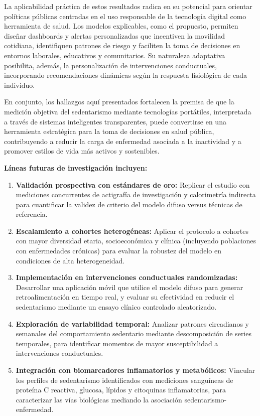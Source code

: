 La aplicabilidad práctica de estos resultados radica en su potencial para orientar políticas públicas centradas en el uso responsable de la tecnología digital como herramienta de salud. Los modelos explicables, como el propuesto, permiten diseñar dashboards y alertas personalizadas que incentiven la movilidad cotidiana, identifiquen patrones de riesgo y faciliten la toma de decisiones en entornos laborales, educativos y comunitarios. Su naturaleza adaptativa posibilita, además, la personalización de intervenciones conductuales, incorporando recomendaciones dinámicas según la respuesta fisiológica de cada individuo.

En conjunto, los hallazgos aquí presentados fortalecen la premisa de que la medición objetiva del sedentarismo mediante tecnologías portátiles, interpretada a través de sistemas inteligentes transparentes, puede convertirse en una herramienta estratégica para la toma de decisiones en salud pública, contribuyendo a reducir la carga de enfermedad asociada a la inactividad y a promover estilos de vida más activos y sostenibles.

\textbf{Líneas futuras de investigación incluyen:}

\begin{enumerate}
    \item \textbf{Validación prospectiva con estándares de oro:} Replicar el estudio con mediciones concurrentes de actigrafía de investigación y calorimetría indirecta para cuantificar la validez de criterio del modelo difuso versus técnicas de referencia.
    
    \item \textbf{Escalamiento a cohortes heterogéneas:} Aplicar el protocolo a cohortes con mayor diversidad etaria, socioeconómica y clínica (incluyendo poblaciones con enfermedades crónicas) para evaluar la robustez del modelo en condiciones de alta heterogeneidad.
    
    \item \textbf{Implementación en intervenciones conductuales randomizadas:} Desarrollar una aplicación móvil que utilice el modelo difuso para generar retroalimentación en tiempo real, y evaluar su efectividad en reducir el sedentarismo mediante un ensayo clínico controlado aleatorizado.
    
    \item \textbf{Exploración de variabilidad temporal:} Analizar patrones circadianos y semanales del comportamiento sedentario mediante descomposición de series temporales, para identificar momentos de mayor susceptibilidad a intervenciones conductuales.
    
    \item \textbf{Integración con biomarcadores inflamatorios y metabólicos:} Vincular los perfiles de sedentarismo identificados con mediciones sanguíneas de proteína C reactiva, glucosa, lípidos y citoquinas inflamatorias, para caracterizar las vías biológicas mediando la asociación sedentarismo-enfermedad.
\end{enumerate}

